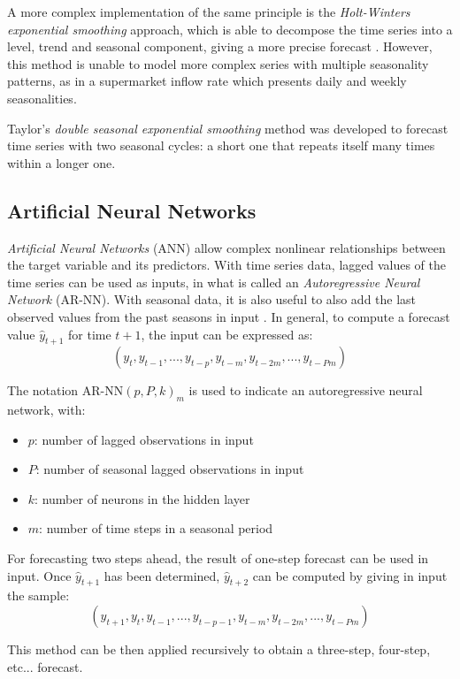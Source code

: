 A more complex implementation of the same principle is the \emph{Holt-Winters exponential smoothing} approach, which is able to decompose the time series into a level, trend and seasonal component, giving a more precise forecast \cite{holt,winters}. However, this method is unable to model more complex series with multiple seasonality patterns, as in a supermarket inflow rate which presents daily and weekly seasonalities.

Taylor’s \emph{double seasonal exponential smoothing} method \cite{taylor} was developed to forecast time series with two seasonal cycles: a short one that repeats itself many times within a longer one.

\subsection{Artificial Neural Networks}
\label{subsec:artificial_neural_networks}

\emph{Artificial Neural Networks} (ANN) allow complex nonlinear relationships between the target variable and its predictors. With time series data, lagged values of the time series can be used as inputs, in what is called an \emph{Autoregressive Neural Network} (AR-NN). With seasonal data, it is also useful to also add the last observed values from the past seasons in input \cite{hyndman2018}. In general, to compute a forecast value \( \hat{y}_{t+1} \) for time \( t+1 \), the input can be expressed as:
\[
  (y_{t}, y_{t-1}, ..., y_{t-p}, y_{t-m}, y_{t-2m}, ..., y_{t-Pm})
\]

The notation \( \text{AR-NN}(p, P, k)_m \) is used to indicate an autoregressive neural network, with:
\begin{itemize}
  \item \( p \): number of lagged observations in input
  \item \( P \): number of seasonal lagged observations in input
  \item \( k \): number of neurons in the hidden layer
  \item \( m \): number of time steps in a seasonal period
\end{itemize}

For forecasting two steps ahead, the result of one-step forecast can be used in input. Once \( \hat{y}_{t+1} \) has been determined, \( \hat{y}_{t+2} \) can be computed by giving in input the sample:
\[ (\hat{y}_{t+1}, y_{t}, y_{t-1}, ..., y_{t-p-1}, y_{t-m}, y_{t-2m}, ..., y_{t-Pm}) \]

This method can be then applied recursively to obtain a three-step, four-step, etc... forecast.

